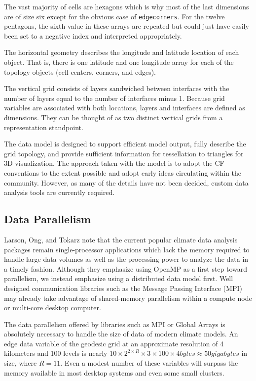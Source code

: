 The vast majority of cells are hexagons which is why most of the last
dimensions are of size six except for the obvious case of \verb+edgecorners+.
For the twelve pentagons, the sixth value in these arrays are repeated but
could just have easily been set to a negative index and interpreted
appropriately.

The horizontal geometry describes the longitude and latitude location of each
object.  That is, there is one latitude and one longitude array for each of
the topology objects (cell centers, corners, and edges).

The vertical grid consists of layers sandwiched between interfaces with the
number of layers equal to the number of interfaces minus 1.   Because grid
variables are associated with both locations, layers and interfaces are
defined as dimensions.  They can be thought of as two distinct vertical grids
from a representation standpoint.

The data model is designed to support efficient model output, fully describe
the grid topology, and provide sufficient information for tessellation to
triangles for 3D visualization.  The approach taken with the model is to adopt
the CF conventions to the extent possible and adopt early ideas circulating
within the community.  However, as many of the details have not been decided,
custom data analysis tools are currently required.

\subsection{Data Parallelism}

Larson, Ong, and Tokarz note that the current popular climate data analysis
packages remain single-processor applications which lack the memory required
to handle large data volumes as well as the processing power to analyze the
data in a timely fashion\cite{MODSIM07:LOT}.  Although they emphasize using
OpenMP as a first step toward parallelism, we instead emphasize using a
distributed data model first.  Well designed communication libraries such as
the Message Passing Interface (MPI)\cite{MPI} may already take advantage of
shared-memory parallelism within a compute node or multi-core desktop
computer.

The data parallelism offered by libraries such as MPI or Global Arrays is
absolutely necessary to handle the size of data of modern climate models.  An
edge data variable of the geodesic grid at an approximate resolution of 4
kilometers and 100 levels is nearly $10 \times 2^{2 \times R} \times 3 \times
100 \times 4 \unit{bytes} \approx 50 \unit{gigabytes}$ in size, where $R=11$.
Even a modest number of these variables will surpass the memory available in
most desktop systems and even some small clusters.

